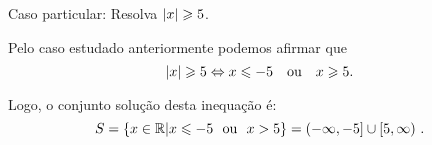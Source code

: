 \begin{exem}
\begin{comment}
   Caso 2: $x-a> 0$ e $x+a> 0$
\begin{equation*}
x-a> 0 \Rightarrow x> a
\end{equation*}
   e
\begin{equation*}
x+a> 0 \Rightarrow x> -a 
\end{equation*}
   Fazendo a interseção dos conjuntos $A_2= \left\{ x \in \R \mid x> a \right\}$ e $B_2= \left\{ x \in \R \mid x> -a \right\}$, obtemos $A_2 \cap B_2= \left\{ x \in \R \mid x> a \right\}$. O conjunto $A_2 \cap B_2$ é o conjunto solução da inequação neste caso.

   Agora fazendo $S= (A_1 \cap B_1) \cup (A_2 \cap B_2)$ obtemos que $S= \left\{ x \in \R \mid x<-a \text{ ou } x> a \right\}$ é o conjunto solução da inequação $\abs{x} > a$.

  Portanto $\abs{x} > a \Leftrightarrow x<-a \text{ ou } x> a$.
\end{comment}
\end{exem}

\begin{exem}
   Caso particular: Resolva $\left|x\right| \geqslant 5$.

Pelo caso estudado anteriormente podemos afirmar que \begin{equation*}
\abs{x} \geq 5 \Leftrightarrow x \leq -5 \ \ \text{ ou } \ \ x \geq 5.
\end{equation*}
   
Logo, o conjunto solução desta inequação é:
\begin{equation*}
S= \{x \in \mathbb{R}| x \leqslant -5 \ \ \mbox{ou} \ \ x > 5\}= (-\infty, -5] \cup [5, \infty) \ . 
\end{equation*}
 \end{exem}
 
